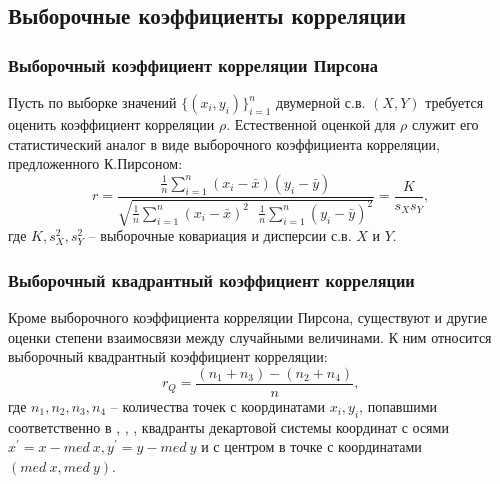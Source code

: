 \subsection{Выборочные коэффициенты корреляции}

\subsubsection{Выборочный коэффициент корреляции Пирсона}
Пусть по выборке значений $\{(x_{i},y_{i})\}_{i=1}^{n}$ двумерной с.в. $(X, Y)$ требуется оценить коэффициент корреляции $\rho$. Естественной оценкой для $\rho$ служит его статистический аналог в виде выборочного коэффициента корреляции, предложенного К.Пирсоном:
\begin{equation}
	r = \dfrac{\frac{1}{n} \sum_{i=1}^{n} (x_i - \bar{x})(y_i - \bar{y})}{\sqrt{\frac{1}{n} \sum_{i=1}^{n} (x_i - \bar{x})^2 \text{ } \frac{1}{n} \sum_{i=1}^{n} (y_i - \bar{y})^2}} = \dfrac{K}{s_X s_Y} \text{,}
\end{equation}
где $K, s_{X}^2, s_{Y}^2$ -- выборочные ковариация и дисперсии с.в. $X \text{ и } Y$.

\subsubsection{Выборочный квадрантный коэффициент корреляции}
Кроме выборочного коэффициента корреляции Пирсона, существуют и другие оценки степени взаимосвязи между случайными величинами. К ним относится выборочный квадрантный коэффициент корреляции:
\begin{equation}
	r_Q = \dfrac{(n_1 + n_3) - (n_2 + n_4)}{n} \text{,}
\end{equation}
где $n_1, n_2, n_3, n_4$ -- количества точек с координатами $x_i, y_i$, попавшими соответственно в , , ,  квадранты декартовой системы координат с осями $x^\prime = x - med \ x, y^\prime = y - med \ y$ и с центром в точке с координатами $(med \ x, med \ y)$.

